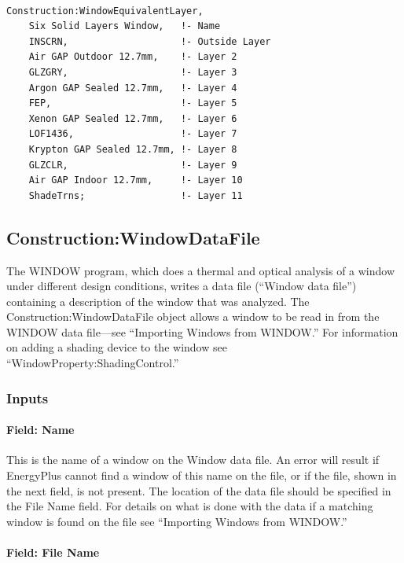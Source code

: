 \begin{lstlisting}

Construction:WindowEquivalentLayer,
    Six Solid Layers Window,   !- Name
    INSCRN,                    !- Outside Layer
    Air GAP Outdoor 12.7mm,    !- Layer 2
    GLZGRY,                    !- Layer 3
    Argon GAP Sealed 12.7mm,   !- Layer 4
    FEP,                       !- Layer 5
    Xenon GAP Sealed 12.7mm,   !- Layer 6
    LOF1436,                   !- Layer 7
    Krypton GAP Sealed 12.7mm, !- Layer 8
    GLZCLR,                    !- Layer 9
    Air GAP Indoor 12.7mm,     !- Layer 10
    ShadeTrns;                 !- Layer 11
\end{lstlisting}

\subsection{Construction:WindowDataFile}\label{constructionwindowdatafile}

The WINDOW program, which does a thermal and optical analysis of a window under different design conditions, writes a data file (``Window data file'') containing a description of the window that was analyzed. The Construction:WindowDataFile object allows a window to be read in from the WINDOW data file---see ``Importing Windows from WINDOW.'' For information on adding a shading device to the window see ``WindowProperty:ShadingControl.''

\subsubsection{Inputs}\label{inputs-42}

\paragraph{Field: Name}\label{field-name-36}

This is the name of a window on the Window data file. An error will result if EnergyPlus cannot find a window of this name on the file, or if the file, shown in the next field, is not present. The location of the data file should be specified in the File Name field. For details on what is done with the data if a matching window is found on the file see ``Importing Windows from WINDOW.''

\paragraph{Field: File Name}\label{field-file-name-000}


